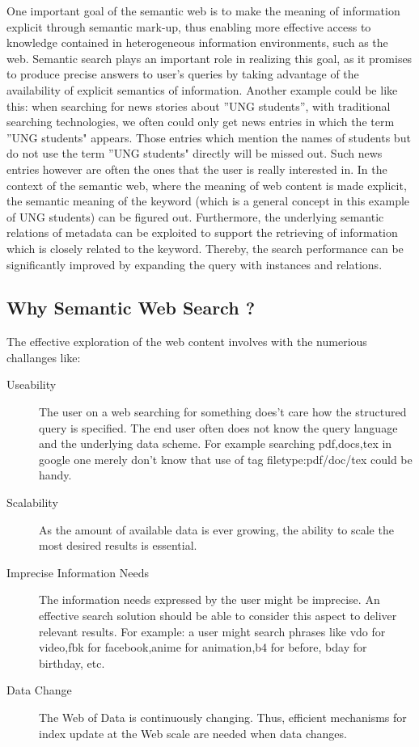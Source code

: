 \documentclass[12pt,a4]{article}
\begin{document}
One important goal of the semantic web is to make the meaning of information explicit through semantic mark-up, thus enabling more effective access to knowledge contained in heterogeneous information environments, such as the web. Semantic search plays an important role in realizing this goal, as it promises to produce precise answers to user’s queries by taking advantage of the availability of explicit semantics of information. Another example could be like this: when searching for news stories about ''UNG students'', with traditional searching technologies, we often could only get news entries in which the term ''UNG students" appears. Those entries which mention the names of students but do not use the term ''UNG students" directly will be missed out. Such news entries however are often the ones that the user is really interested in. In the context of the semantic web, where the meaning of web content is made explicit, the semantic meaning of the keyword (which is a general concept in this example of UNG students) can be figured out. Furthermore, the underlying semantic relations of metadata can be exploited to support the retrieving of information which is closely related to the keyword. Thereby, the search performance can be significantly improved by expanding the query with instances and relations.

\subsection{Why Semantic Web Search ?}
The effective exploration of the web content involves with the numerious challanges like:
\begin{description}
\item[Useability] The user on a web searching for something does't care how the structured query is specified. The end user often does not know the query language and the underlying data scheme. For example searching pdf,docs,tex in google one merely don't know that use of tag filetype:pdf/doc/tex could be handy.
\item[Scalability] As the amount of available data is ever growing, the ability to scale the most desired results is essential.
\item[Imprecise Information Needs] The information needs expressed by the user might be imprecise. An effective search solution should be able to consider this aspect to deliver relevant results. For example: a user might search phrases like vdo for video,fbk for facebook,anime for animation,b4 for before, bday for birthday, etc. 
\item[Data Change] The Web of Data is continuously changing. Thus, efficient mechanisms for index update at the Web scale are needed when data changes. 
\end{description}
\end{document}
